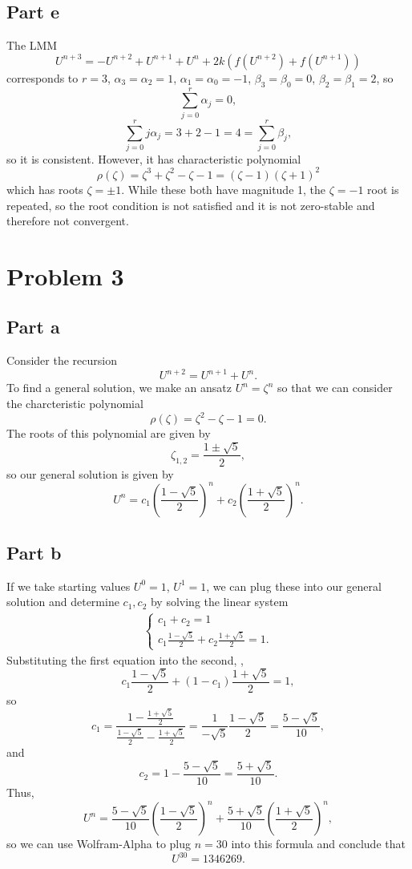 \documentclass{article}
\begin{document}
\subsection{Part e}
The LMM 
\[
U^{n+3} = -U^{n+2} + U^{n+1} +U^{n}+2k(f(U^{n+2})+f(U^{n+1}))
\]
corresponds to $r=3$, $\alpha_3=\alpha_2=1$, $\alpha_1=\alpha_0=-1$, $\beta_3=\beta_0=0$, $\beta_2=\beta_1=2$, so
\[
\sum_{j=0}^r\alpha_j=0,
\]
\[
\sum_{j=0}^rj\alpha_j=3+2-1=4=\sum_{j=0}^r\beta_j,
\]
so it is consistent. However, it has characteristic polynomial 
\[
\rho(\zeta)=\zeta^3+\zeta^2-\zeta-1=(\zeta-1)(\zeta+1)^2
\]
which has roots $\zeta=\pm1$. While these both have magnitude 1, the $\zeta=-1$ root is repeated, so the root condition is not satisfied and it is not zero-stable and therefore not convergent. 

\section{Problem 3}
\subsection{Part a}
Consider the recursion
\[
U^{n+2} = U^{n+1} + U^n.
\]
To find a general solution, we make an ansatz $U^n=\zeta^n$ so that we can consider the charcteristic polynomial
\[
\rho(\zeta)=\zeta^2-\zeta-1=0.
\]
The roots of this polynomial are given by
\[
\zeta_{1,2}=\frac{1\pm\sqrt{5}}{2},
\]
so our general solution is given by
\[
U^n=c_1\left(\frac{1-\sqrt{5}}{2}\right)^n+c_2\left(\frac{1+\sqrt{5}}{2}\right)^n.
\]

\subsection{Part b}
If we take starting values $U^0=1$, $U^1=1$, we can plug these into our general solution and determine $c_1,c_2$ by solving the linear system
\begin{align*}
	\begin{cases}
		c_1+c_2=1\\
		c_1\frac{1-\sqrt{5}}{2}+c_2\frac{1+\sqrt{5}}{2}=1.
	\end{cases}
\end{align*}
Substituting the first equation into the second, ,
\[
c_1\frac{1-\sqrt{5}}{2}+(1-c_1)\frac{1+\sqrt{5}}{2}=1,
\]
so
\[
c_1=\frac{1-\frac{1+\sqrt{5}}{2}}{\frac{1-\sqrt{5}}{2}-\frac{1+\sqrt{5}}{2}}=\frac{1}{-\sqrt{5}}\frac{1-\sqrt{5}}{2}=\frac{5-\sqrt{5}}{10},
\]
and
\[
c_2=1-\frac{5-\sqrt{5}}{10}=\frac{5+\sqrt{5}}{10}.
\]
Thus, 
\[
U^n=\frac{5-\sqrt{5}}{10}\left(\frac{1-\sqrt{5}}{2}\right)^n+\frac{5+\sqrt{5}}{10}\left(\frac{1+\sqrt{5}}{2}\right)^n,
\]
so we can use Wolfram-Alpha to plug $n=30$ into this formula and conclude that
\[
U^{30}=1346269.
\]
\end{document}
